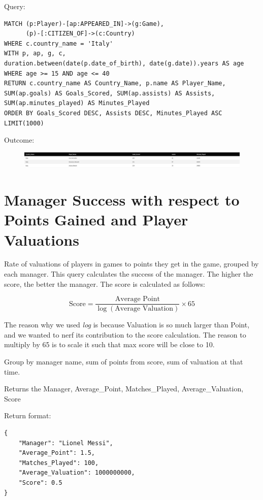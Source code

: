 \documentclass{Configuration_Files/PoliMi3i_thesis}
\begin{document}
Query:

\begin{lstlisting}[language=Cypher]
MATCH (p:Player)-[ap:APPEARED_IN]->(g:Game),
      (p)-[:CITIZEN_OF]->(c:Country)
WHERE c.country_name = 'Italy'
WITH p, ap, g, c,
duration.between(date(p.date_of_birth), date(g.date)).years AS age
WHERE age >= 15 AND age <= 40
RETURN c.country_name AS Country_Name, p.name AS Player_Name, SUM(ap.goals) AS Goals_Scored, SUM(ap.assists) AS Assists, SUM(ap.minutes_played) AS Minutes_Played
ORDER BY Goals_Scored DESC, Assists DESC, Minutes_Played ASC
LIMIT(1000)
\end{lstlisting}


Outcome:
\begin{figure}[H]
    \centering
    \includegraphics[width=\linewidth]{Project Template/Images/query_output/q11.png}
\end{figure}













\section{Manager Success with respect to Points Gained and Player Valuations}
Rate of valuations of players in games to points they get in the game, grouped by each manager. This query calculates the success of the manager. The higher the score, the better the manager. The score is calculated as follows:

\[
\text{Score} = \frac{\text{Average Point}}{\log(\text{Average Valuation})} \times 65
\]

The reason why we used \textit{log} is because Valuation is so much larger than Point, and we wanted to nerf its contribution to the score calculation. The reason to multiply by 65 is to scale it such that max score will be close to 10.

Group by manager name, sum of points from score, sum of valuation at that time.

Returns the Manager, Average\_Point, Matches\_Played, Average\_Valuation, Score

Return format:
\begin{lstlisting}[style=json]
{
    "Manager": "Lionel Messi",
    "Average_Point": 1.5,
    "Matches_Played": 100,
    "Average_Valuation": 1000000000,
    "Score": 0.5
}
\end{lstlisting}
\end{document}
